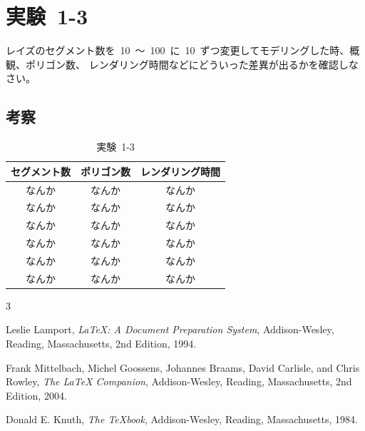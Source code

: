 \documentclass[a4j]{jarticle}
\begin{document}
%

\newpage
\section{実験\ 1-3}
レイズのセグメント数を\ 10\ ～\ 100\ に\ 10\ ずつ変更してモデリングした時、概観、ポリゴン数、
レンダリング時間などにどういった差異が出るかを確認しなさい。
\subsection{考察}
%

%

\begin{table}
  \centering
  \begin{tabular}{|c|c|c|}
  \hline
  セグメント数 & ポリゴン数 & レンダリング時間 \\
  \hline
  なんか & なんか & なんか \\
  なんか & なんか & なんか \\
  なんか & なんか & なんか \\
  なんか & なんか & なんか \\
  なんか & なんか & なんか \\
  なんか & なんか & なんか \\
  \hline
  \end{tabular}
  \caption{実験\ 1-3}
\end{table}

\newpage
\begin{thebibliography}{3}

Leslie Lamport,
\textit{LaTeX: A Document Preparation System},
Addison-Wesley, Reading, Massachusetts, 2nd Edition, 1994.

Frank Mittelbach, Michel Goossens, Johannes Braams, David Carlisle, and Chris Rowley,
\textit{The LaTeX Companion},
Addison-Wesley, Reading, Massachusetts, 2nd Edition, 2004.

Donald E. Knuth,
\textit{The TeXbook},
Addison-Wesley, Reading, Massachusetts, 1984.

\end{thebibliography}
\end{document}
